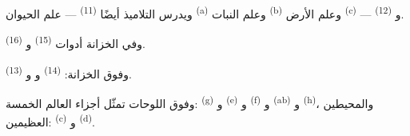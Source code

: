 ويدرس التلاميذ أيضًا  \textsuperscript{(11)} --- علم
الحيوان \textsuperscript{(a)} وعلم النبات \textsuperscript{(b)} وعلم الأرض
\textsuperscript{(c)} --- و \textsuperscript{(12)}.

وفي الخزانة أدوات  \textsuperscript{(15)} و
\textsuperscript{(16)}.

وفوق الخزانة:  \textsuperscript{(14)} و
و \textsuperscript{(13)}.

وفوق اللوحات  تمثّل أجزاء العالم الخمسة: 
\textsuperscript{(g)} و \textsuperscript{(e)} و
\textsuperscript{(f)} و \textsuperscript{(ab)} و
\textsuperscript{(h)}، والمحيطين العظيمين:  \textsuperscript{(c)}
و \textsuperscript{(d)}.
\VUsaut{6.0mm}
\VUfilet{22mm}
